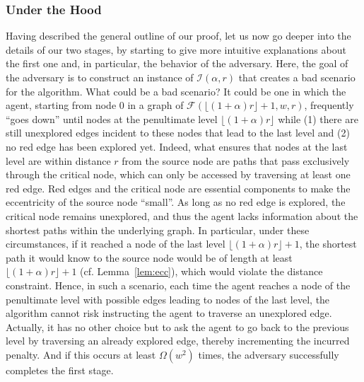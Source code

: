 \documentclass[11pt]{article}
\begin{document}
\subsubsection{Under the Hood}
Having described the general outline of our proof, let us now go deeper into the details of our two stages, by starting to give more intuitive explanations about the first one and, in particular, the behavior of the adversary. Here, the goal of the adversary is to construct an instance of $\mathcal{I}(\alpha, r)$ that creates a bad scenario for the algorithm. What could be a bad scenario?
%
It could be one in which the agent, starting from node $0$ in a graph
of $\mathcal{F}(\lfloor(1+\alpha)r\rfloor+1,w,r)$, frequently ``goes
down'' until nodes at the penultimate level
$\lfloor(1+\alpha)r\rfloor$ while (1) there are still unexplored
edges incident to these nodes that lead to the last level and (2) no
red edge has been explored yet.
%
Indeed, what ensures that nodes at the last level are within distance $r$ from the source node are paths that pass exclusively through the critical node, which can only be accessed by traversing at least one red edge. Red edges and the critical node are essential components to make the eccentricity of the source node ``small''. As long as no red edge is explored, the critical node remains unexplored, and thus the agent lacks information about the shortest paths within the underlying graph. In particular, under these circumstances, if it reached a node of the last level $\lfloor(1+\alpha)r\rfloor+1$, the shortest path it would know to the source node would be of length at least  $\lfloor(1+\alpha)r\rfloor+1$ (cf. Lemma~\ref{lem:ecc}), which would violate the distance constraint. Hence, in such a scenario, each time the agent reaches a node of the penultimate level with possible edges leading to nodes of the last level, the algorithm cannot risk instructing the agent to traverse an unexplored edge. Actually, it has no other choice but to ask the agent to go back to the previous level by traversing an already explored edge, thereby incrementing the incurred penalty. And if this occurs at least $\Omega(w^2)$ times, the adversary successfully completes the first stage.
\end{document}
